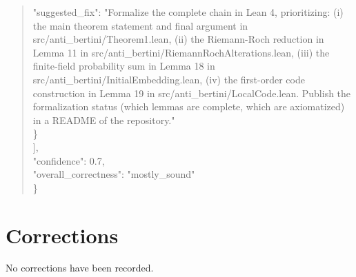 \documentclass[11pt]{article}
\begin{document}
\begin{quote}
      "suggested\_fix": "Formalize the complete chain in Lean 4, prioritizing: (i) the main theorem statement and final argument in src/anti\_bertini/Theorem1.lean, (ii) the Riemann-Roch reduction in Lemma 11 in src/anti\_bertini/RiemannRochAlterations.lean, (iii) the finite-field probability sum in Lemma 18 in src/anti\_bertini/InitialEmbedding.lean, (iv) the first-order code construction in Lemma 19 in src/anti\_bertini/LocalCode.lean. Publish the formalization status (which lemmas are complete, which are axiomatized) in a README of the repository."\\
    \}\\
  ],\\
  "confidence": 0.7,\\
  "overall\_correctness": "mostly\_sound"\\
\}\\
\end{quote}

\section*{Corrections}
No corrections have been recorded.
\end{document}
